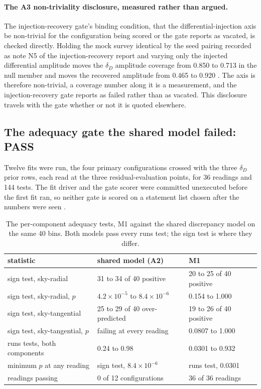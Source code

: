 \documentclass[11pt]{article}
\newcommand{\dD}{\ensuremath{\delta_D}}
\begin{document}
\paragraph{The A3 non-triviality disclosure, measured rather than argued.} The injection-recovery gate's binding condition, that the differential-injection axis be non-trivial for the configuration being scored or the gate reports as vacated, is checked directly. Holding the mock survey identical by the seed pairing recorded as note N5 of the injection-recovery report and varying only the injected differential amplitude moves the \dD{} amplitude coverage from 0.850 to 0.713 in the null member and moves the recovered amplitude from 0.465 to 0.920 \citep{AXIGatesReport2026}. The axis is therefore non-trivial, a coverage number along it is a measurement, and the injection-recovery gate reports as failed rather than as vacated. This disclosure travels with the gate whether or not it is quoted elsewhere.

\subsection{The adequacy gate the shared model failed: PASS}
\label{sec:gates-b}

Twelve fits were run, the four primary configurations crossed with the three \dD{} prior rows, each read at the three residual-evaluation points, for 36 readings and 144 tests. The fit driver and the gate scorer were committed unexecuted before the first fit ran, so neither gate is scored on a statement list chosen after the numbers were seen \citep{AXIFitReport2026}.

\begin{table}[htbp]
\centering
\small
\caption{The per-component adequacy tests, M1 against the shared discrepancy model on the same 40 bins. Both models pass every runs test; the sign test is where they differ.}
\label{tab:xgb}
\begin{tabular}{lll}
\toprule
statistic & shared model (A2) & M1 \\
\midrule
sign test, sky-radial & 31 to 34 of 40 positive & 20 to 25 of 40 positive \\
sign test, sky-radial, $p$ & $4.2\times10^{-5}$ to $8.4\times10^{-6}$ & 0.154 to 1.000 \\
sign test, sky-tangential & 25 to 29 of 40 over-predicted & 19 to 26 of 40 positive \\
sign test, sky-tangential, $p$ & failing at every reading & 0.0807 to 1.000 \\
runs tests, both components & 0.24 to 0.98 & 0.0301 to 0.932 \\
minimum $p$ at any reading & sign test, $8.4\times10^{-6}$ & runs test, 0.0301 \\
readings passing & 0 of 12 configurations & 36 of 36 readings \\
\bottomrule
\end{tabular}
\end{table}
\end{document}

